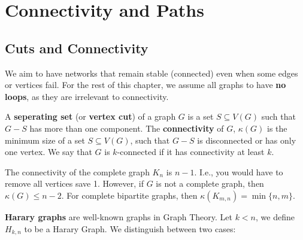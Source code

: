 \documentclass{Book}
\begin{document}
\chapter{Connectivity and Paths}

\section{Cuts and Connectivity}%
\label{sec:4.1}

We aim to have networks that remain stable (connected) even when some edges or vertices fail. For the rest of this chapter, we assume all graphs to have \textbf{no loops}, as they are irrelevant to connectivity.

A \textbf{seperating set} (or \textbf{vertex cut}) of a graph $G$ is a set $S \subseteq V(G)$ such that $G - S$ has more than one component. The \textbf{connectivity} of $G$, $\kappa(G)$ is the minimum size of a set $S \subseteq V(G)$, such that $G-S$ is disconnected or has only one vertex. We say that $G$ is $k$-connected if it has connectivity at least $k$.

The connectivity of the complete graph $K_{n}$ is $n-1$. I.e., you would have to remove all vertices save 1. However, if $G$ is not a complete graph, then $\kappa(G) \le n-2$. For complete bipartite graphs, then $\kappa(K_{m,n}) = \min\{n,m\}$.

\textbf{Harary graphs} are well-known graphs in Graph Theory. Let $k < n$, we define $H_{k,n}$ to be a Harary Graph. We distinguish between two cases:
\end{document}
